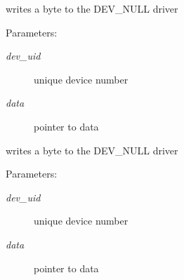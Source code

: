 writes a byte to the DEV\_\-NULL driver 

\begin{Desc}
\item[Parameters:]
\begin{description}
\item[{\em dev\_\-uid}]unique device number \item[{\em data}]pointer to data\end{description}
\end{Desc}
writes a byte to the DEV\_\-NULL driver

\begin{Desc}
\item[Parameters:]
\begin{description}
\item[{\em dev\_\-uid}]unique device number \item[{\em data}]pointer to data \end{description}
\end{Desc}
